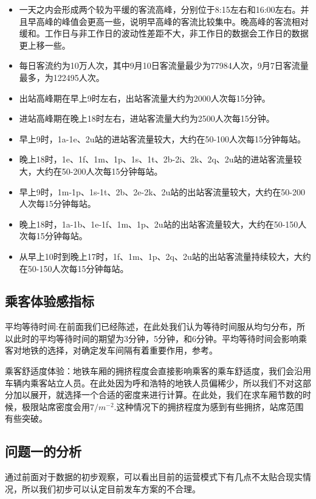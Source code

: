 \documentclass[12pt,a4paper]{mcmthesis}
\begin{document}
    \begin{itemize}
        \item 一天之内会形成两个较为平缓的客流高峰，分别位于8:15左右和16:00左右。并且早高峰的峰值会更高一些，说明早高峰的客流比较集中。晚高峰的客流相对缓和。工作日与非工作日的波动性差距不大，非工作日的数据会工作日的数据更上移一些。
        \item 每日客流约为10万人次，其中9月10日客流量最少为77984人次，9月7日客流量最多，为122495人次。
        \item 出站高峰期在早上9时左右，出站客流量大约为2000人次每15分钟。
        \item 进站高峰期在晚上18时左右，进站客流量大约为2500人次每15分钟。
        \item 早上9时，1a-1e、2u站的进站客流量较大，大约在50-100人次每15分钟每站。
        \item 晚上18时，1e、1f、1m、1p、1s、1t、2b-2i、2k、2q、2u站的进站客流量较大，大约在50-200人次每15分钟每站。
        \item 早上9时，1m-1p、1s-1t、2b、2e-2k、2u站的出站客流量较大，大约在50-200人次每15分钟每站。
        \item 晚上18时，1a-1b、1e-1f、1m、1p、2u站的出站客流量较大，大约在50-150人次每15分钟每站。
        \item 从早上10时到晚上17时，1f、1m、1p、2q、2u站的出站客流量持续较大，大约在50-150人次每15分钟每站。
    \end{itemize}

    \subsection{乘客体验感指标}
    平均等待时间:在前面我们已经陈述，在此处我们认为等待时间服从均匀分布，所以此时的平均等待时间的期望为3分钟，5分钟，和6分钟。平均等待时间会影响乘客对地铁的选择，对确定发车间隔有着重要作用，参考\cite{地铁客流}。

    乘客舒适度体验：地铁车厢的拥挤程度会直接影响乘客的乘车舒适度，我们会沿用车辆内乘客站立人员。在此处因为呼和浩特的地铁人员偏稀少，所以我们不对这部分加以展开，就选择一个合适的密度来进行计算。在此处，我们在求车厢节数的时候，极限站席密度会用$7/m^{-2}$.这种情况下的拥挤程度为感到有些拥挤，站席范围有些突破。

    \subsection{问题一的分析}

    通过前面对于数据的初步观察，可以看出目前的运营模式下有几点不太贴合现实情况，所以我们初步可以认定目前发车方案的不合理。
\end{document}
